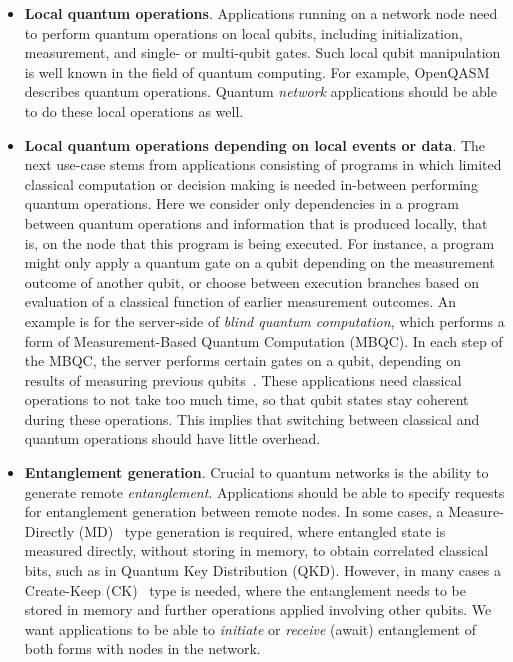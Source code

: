 \begin{itemize}
      \item \textbf{Local quantum operations}.
            Applications running on a network node need to perform quantum operations on local qubits, including initialization, measurement, and single- or multi-qubit gates.
            Such local qubit manipulation is well known in the field of quantum computing. For example, OpenQASM~\cite{cross2017openqasm} describes quantum operations.
            Quantum \textit{network} applications should be able to do these local operations as well.

      \item \textbf{Local quantum operations depending on local events or data}.
            The next use-case stems from applications consisting of programs in which limited classical computation or decision making is needed in-between performing quantum operations.
            Here we consider only dependencies in a program between quantum operations and information that is produced locally, that is, on the node that this program is being executed.
            For instance, a program might only apply a quantum gate on a qubit depending on the measurement outcome of another qubit, or choose between execution branches based on evaluation of a classical function of earlier measurement outcomes.
            An example is for the server-side of \textit{blind quantum computation}, which performs a form of Measurement-Based Quantum Computation (MBQC).
            In each step of the MBQC, the server performs certain gates on a qubit, depending on results of measuring previous qubits~\cite{fitzsimons2017private}.
            These applications need classical operations to not take too much time, so that qubit states stay coherent during these operations.
            This implies that switching between classical and quantum operations should have little overhead.

      \item \textbf{Entanglement generation}.
            Crucial to quantum networks is the ability to generate remote \textit{entanglement}.
            Applications should be able to specify requests for entanglement generation between remote nodes.
            In some cases, a Measure-Directly (MD)~\cite{dahlberg2019linklayer} type generation is required, where entangled state is measured directly, without storing in memory, to obtain correlated classical bits, such as in Quantum Key Distribution (QKD).
            However, in many cases a Create-Keep (CK)~\cite{dahlberg2019linklayer} type is needed, where the entanglement needs to be stored in memory and further operations applied involving other qubits.
            We want applications to be able to \textit{initiate} or \textit{receive} (await) entanglement of both forms with nodes in the network.


\end{itemize}
